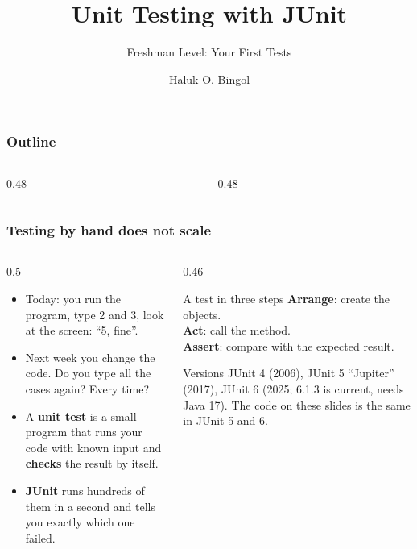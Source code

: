 \documentclass[aspectratio=169,10pt,compress]{beamer}
\title{Unit Testing with JUnit}
\subtitle{Freshman Level: Your First Tests}
\author[Bingol]{Haluk O. Bingol}
\institute[FCIS]{
    Faculty of Computer and Information Sciences\\
    Yeditepe University
}
\date{
	{\tiny \hbTimeStamp}
}
\begin{document}
\begin{frame}[t,fragile]
  \titlepage
\end{frame}




\begin{frame}[t,fragile] \frametitle{Outline}
  \begin{columns}[T]
    \begin{column}{0.48\textwidth}
      \tableofcontents[sections={1-3}, hideallsubsections]
    \end{column}
    \begin{column}{0.48\textwidth}
      \tableofcontents[sections={4-6}, hideallsubsections]
    \end{column}
  \end{columns}
\end{frame}





\begin{frame}[t,fragile] \frametitle{Testing by hand does not scale}
  \begin{columns}[T]
    \begin{column}{0.5\textwidth}
      \begin{itemize}\small
        \item Today: you run the program, type 2 and 3, look at the screen: ``5, fine''.
        \item Next week you change the code. Do you type all the cases again? Every time?
        \item A \textbf{unit test} is a small program that runs your code with known input and
              \textbf{checks} the result by itself.
        \item \textbf{JUnit} runs hundreds of them in a second and tells you exactly which one failed.
      \end{itemize}
    \end{column}
    \begin{column}{0.46\textwidth}
      \begin{block}{A test in three steps}
        \small
        \textbf{Arrange}: create the objects.\\
        \textbf{Act}: call the method.\\
        \textbf{Assert}: compare with the expected result.
      \end{block}
      \begin{block}{Versions}
        \small JUnit 4 (2006), JUnit 5 ``Jupiter'' (2017), JUnit 6 (2025; 6.1.3 is current, needs Java 17).
        The code on these slides is the same in JUnit 5 and 6.
      \end{block}
    \end{column}
  \end{columns}
\end{frame}
\end{document}
